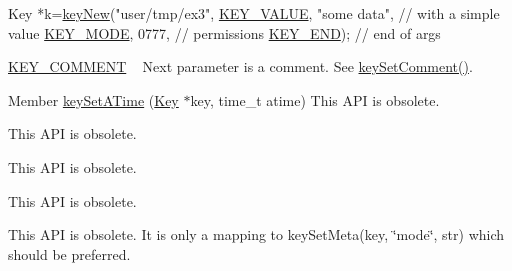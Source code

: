 \begin{DoxyRefList}
\begin{DoxyItemize}
\begin{DoxyCodeInclude}
Key *k=\hyperlink{group__key_gad23c65b44bf48d773759e1f9a4d43b89}{keyNew}(\textcolor{stringliteral}{"user/tmp/ex3"},
        \hyperlink{group__key_gga9b703ca49f48b482def322b77d3e6bc8ac66e4a49d09212b79f5754ca6db5bd2e}{KEY\_VALUE}, \textcolor{stringliteral}{"some data"},    \textcolor{comment}{// with a simple value}
        \hyperlink{group__key_gga9b703ca49f48b482def322b77d3e6bc8a1b0a91ff3a855d6993930ebf0abaa518}{KEY\_MODE}, 0777,            \textcolor{comment}{// permissions}
        \hyperlink{group__key_gga9b703ca49f48b482def322b77d3e6bc8aa8adb6fcb92dec58fb19410eacfdd403}{KEY\_END});                  \textcolor{comment}{// end of args}
\end{DoxyCodeInclude}

\item \hyperlink{group__key_gga9b703ca49f48b482def322b77d3e6bc8ac29427bb47cc31689d02912e36161ee3}{K\+E\+Y\+\_\+\+C\+O\+M\+M\+E\+NT} ~\newline
 Next parameter is a comment. See \hyperlink{group__meta_ga8863a877a84fa46e6017fe72e49b89c1}{key\+Set\+Comment()}. 
\begin{DoxyCodeInclude}
\end{DoxyCodeInclude}
Member \hyperlink{group__meta_ga995d8b84731673c88c7c01f3fed538b9}{key\+Set\+A\+Time} (\hyperlink{classkdb_1_1Key}{Key} $\ast$key, time\+\_\+t atime) This A\+PI is obsolete. 
\end{DoxyItemize}
\item[\label{deprecated__deprecated000026}%
\Hypertarget{deprecated__deprecated000026}%
Member \hyperlink{group__meta_ga9f502ecab8ab43f0b17220fcc95f3fa5}{key\+Set\+C\+Time} (\hyperlink{classkdb_1_1Key}{Key} $\ast$key, time\+\_\+t ctime)]This A\+PI is obsolete. 
\item[\label{deprecated__deprecated000018}%
\Hypertarget{deprecated__deprecated000018}%
Member \hyperlink{group__meta_gaae575bd86a628a15ee45baa860522e75}{key\+Set\+Dir} (\hyperlink{classkdb_1_1Key}{Key} $\ast$key)]This A\+PI is obsolete. 
\item[\label{deprecated__deprecated000017}%
\Hypertarget{deprecated__deprecated000017}%
Member \hyperlink{group__meta_ga9e3d0fb3f7ba906e067727b9155d22e3}{key\+Set\+G\+ID} (\hyperlink{classkdb_1_1Key}{Key} $\ast$key, gid\+\_\+t gid)]This A\+PI is obsolete. 
\item[\label{deprecated__deprecated000020}%
\Hypertarget{deprecated__deprecated000020}%
Member \hyperlink{group__meta_ga8803037e35b9da1ce492323a88ff6bc3}{key\+Set\+Mode} (\hyperlink{classkdb_1_1Key}{Key} $\ast$key, mode\+\_\+t mode)]This A\+PI is obsolete. It is only a mapping to key\+Set\+Meta(key, \char`\"{}mode\char`\"{}, str) which should be preferred. 

\end{DoxyRefList}
